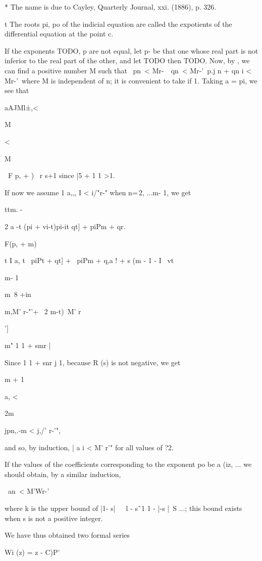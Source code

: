 * The name is due to Cayley, Quarterly Journal, xxi. (1886), p. 326.

t The roots pi, po of the indicial equation are called the expotients
of the differential equation at the point c.

%
%


If the exponents TODO, p are not equal, let p- be that one whose real
part is not inferior to the real part of the other, and let
TODO
then
TODO.
Now, by , we can find a positive number M
such that \ pn\ < Mr-\ \ qn\ < Mr-'\ p.j n + qn i < Mr-'\ where M is
independent of n; it is convenient to take if 1. Taking a = pi, we
see that

aAJMl±,<

M

<

M

\ F p, + ) \ r s+1 since |5 + 1 1 >1.

If now we assume 1 a,,, I < i/"r-" when n=\,2, ...m- 1, we get

ttm. -

2 a -t (pi + vi-t)pi-it qt] + piPm + qr.

F(p, + m)

t I a, t \ piPt + qt] + \ piPm + q,a ! + s (m - 1 - I \ vt

m- 1

m\ 8 +in\

m,M' r-"'+ \ 2 m-t)\ M' r

']

m" 1 1 + smr |

Since 1 1 + snr j 1, because R (s) is not negative, we get

m + 1

a, <

2m

jpn,.-m < j,/' r-'",

and so, by induction, | a i < M' r'" for all values of ?2.

If the values of the coefficients corresponding to the exponent po be
a (iz, ... we should obtain, by a similar induction,

\ an\ < M'Wr-'\

where k is the upper bound of |1- s|~\ \ l - s\~\ 1 1 - |-s |~S ...;
this bound exists when s is not a positive integer.

We have thus obtained two formal series

Wi (z) = z - C)P'

